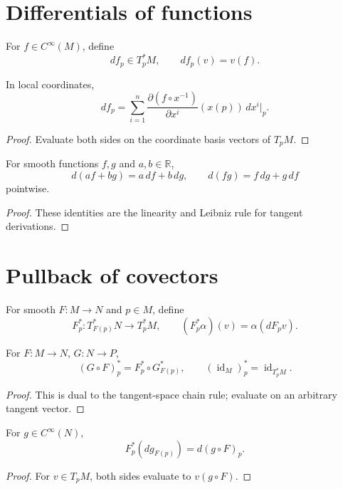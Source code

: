 \section{Differentials of functions}
\begin{definition}\label{def:vii05-df}
For \(f\in C^\infty(M)\), define
\[
df_p\in T_p^*M,\qquad df_p(v)=v(f).
\]
\end{definition}

\begin{theorem}\label{thm:vii05-df-coordinate}
In local coordinates,
\[
df_p=\sum_{i=1}^n
\frac{\partial(f\circ x^{-1})}{\partial x^i}(x(p))\,dx^i|_p.
\]
\end{theorem}
\begin{proof}
Evaluate both sides on the coordinate basis vectors of \(T_pM\).
\end{proof}

\begin{proposition}\label{prop:vii05-df-rules}
For smooth functions \(f,g\) and \(a,b\in\mathbb R\),
\[
d(af+bg)=a\,df+b\,dg,\qquad
d(fg)=f\,dg+g\,df
\]
pointwise.
\end{proposition}
\begin{proof}
These identities are the linearity and Leibniz rule for tangent derivations.
\end{proof}

\section{Pullback of covectors}
\begin{definition}\label{def:vii05-pullback-point}
For smooth \(F:M\to N\) and \(p\in M\), define
\[
F_p^*:T_{F(p)}^*N\to T_p^*M,\qquad
(F_p^*\alpha)(v)=\alpha(dF_pv).
\]
\end{definition}

\begin{theorem}\label{thm:vii05-pullback-functorial}
For \(F:M\to N\), \(G:N\to P\),
\[
(G\circ F)_p^*=F_p^*\circ G_{F(p)}^*,
\qquad
(\operatorname{id}_M)_p^*=\operatorname{id}_{T_p^*M}.
\]
\end{theorem}
\begin{proof}
This is dual to the tangent-space chain rule; evaluate on an arbitrary tangent vector.
\end{proof}

\begin{theorem}\label{thm:vii05-pullback-df}
For \(g\in C^\infty(N)\),
\[
F_p^*(dg_{F(p)})=d(g\circ F)_p.
\]
\end{theorem}
\begin{proof}
For \(v\in T_pM\), both sides evaluate to \(v(g\circ F)\).
\end{proof}

